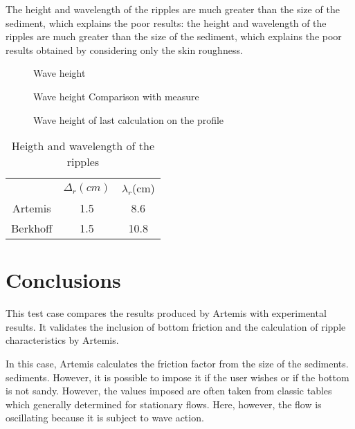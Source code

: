 The height and wavelength of the ripples are much greater than the size of the sediment, which
explains the poor results: the height and wavelength of the ripples are much greater than the size
of the sediment, which explains the poor results obtained by considering only the skin roughness.

\begin{figure}[h]
\begin{center}
\end{center}
\caption{Wave height}
\label{fig:friction_WH}
\end{figure}

\begin{figure}[h]
\begin{center}
\end{center}
\caption{Wave height Comparison with measure}
\label{fig:friction_comparison}
\end{figure}

\begin{figure}[h]
\begin{center}
\end{center}
\caption{Wave height of last calculation on the profile}
\label{fig:friction_profile}
\end{figure}

\begin{table}
  \begin{center}
\begin{tabular*}{0.5\linewidth}{@{\extracolsep{\fill}}ccc}
\toprule
\toprule
& $\Delta_r(cm)$&$\lambda_r$(cm) \\
Artemis&1.5&8.6\\
Berkhoff&1.5&10.8\\
\bottomrule
\bottomrule
\end{tabular*}
\caption{Heigth and wavelength of the ripples}
\label{tab:friction_ripples}
\end{center}
\end{table}
\section{Conclusions}
This test case compares the results produced by Artemis with experimental results. It
validates the inclusion of bottom friction and the calculation of ripple characteristics by Artemis.

In this case, Artemis calculates the friction factor from the size of the sediments.
sediments. However, it is possible to impose it if the user wishes or if the bottom
is not sandy. However, the values imposed are often taken from classic tables which
generally determined for stationary flows. Here, however, the flow is
oscillating because it is subject to wave action.

